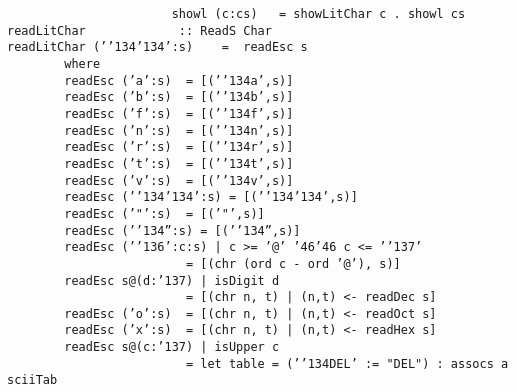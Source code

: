 \mbox{\tt \ \ \ \ \ \ \ \ \ \ \ \ \ \ \ \ \ \ \ \ \ \ \ showl\ (c:cs)\ \ \ =\ showLitChar\ c\ .\ showl\ cs}
%
\eprogB\noindent\bprogB
\mbox{\tt readLitChar\ \ \ \ \ \ \ \ \ \ \ \ \ ::\ ReadS\ Char}\\
\mbox{\tt readLitChar\ ('{\char'134}{\char'134}':s)\ \ \ \ =\ \ readEsc\ s}\\
\mbox{\tt \ \ \ \ \ \ \ \ where}\\
\mbox{\tt \ \ \ \ \ \ \ \ readEsc\ ('a':s)\ \ =\ [('{\char'134}a',s)]}\\
\mbox{\tt \ \ \ \ \ \ \ \ readEsc\ ('b':s)\ \ =\ [('{\char'134}b',s)]}\\
\mbox{\tt \ \ \ \ \ \ \ \ readEsc\ ('f':s)\ \ =\ [('{\char'134}f',s)]}\\
\mbox{\tt \ \ \ \ \ \ \ \ readEsc\ ('n':s)\ \ =\ [('{\char'134}n',s)]}\\
\mbox{\tt \ \ \ \ \ \ \ \ readEsc\ ('r':s)\ \ =\ [('{\char'134}r',s)]}\\
\mbox{\tt \ \ \ \ \ \ \ \ readEsc\ ('t':s)\ \ =\ [('{\char'134}t',s)]}\\
\mbox{\tt \ \ \ \ \ \ \ \ readEsc\ ('v':s)\ \ =\ [('{\char'134}v',s)]}\\
\mbox{\tt \ \ \ \ \ \ \ \ readEsc\ ('{\char'134}{\char'134}':s)\ =\ [('{\char'134}{\char'134}',s)]}\\
\mbox{\tt \ \ \ \ \ \ \ \ readEsc\ ('"':s)\ \ =\ [('"',s)]}\\
\mbox{\tt \ \ \ \ \ \ \ \ readEsc\ ('{\char'134}'':s)\ =\ [('{\char'134}'',s)]}\\
\mbox{\tt \ \ \ \ \ \ \ \ readEsc\ ('{\char'136}':c:s)\ |\ c\ >=\ '@'\ {\char'46}{\char'46}\ c\ <=\ '{\char'137}'}\\
\mbox{\tt \ \ \ \ \ \ \ \ \ \ \ \ \ \ \ \ \ \ \ \ \ \ \ \ \ =\ [(chr\ (ord\ c\ -\ ord\ '@'),\ s)]}\\
\mbox{\tt \ \ \ \ \ \ \ \ readEsc\ s@(d:{\char'137})\ |\ isDigit\ d}\\
\mbox{\tt \ \ \ \ \ \ \ \ \ \ \ \ \ \ \ \ \ \ \ \ \ \ \ \ \ =\ [(chr\ n,\ t)\ |\ (n,t)\ <-\ readDec\ s]}\\
\mbox{\tt \ \ \ \ \ \ \ \ readEsc\ ('o':s)\ \ =\ [(chr\ n,\ t)\ |\ (n,t)\ <-\ readOct\ s]}\\
\mbox{\tt \ \ \ \ \ \ \ \ readEsc\ ('x':s)\ \ =\ [(chr\ n,\ t)\ |\ (n,t)\ <-\ readHex\ s]}\\
\mbox{\tt \ \ \ \ \ \ \ \ readEsc\ s@(c:{\char'137})\ |\ isUpper\ c}\\
\mbox{\tt \ \ \ \ \ \ \ \ \ \ \ \ \ \ \ \ \ \ \ \ \ \ \ \ \ =\ let\ table\ =\ ('{\char'134}DEL'\ :=\ "DEL")\ :\ assocs\ asciiTab}\\

